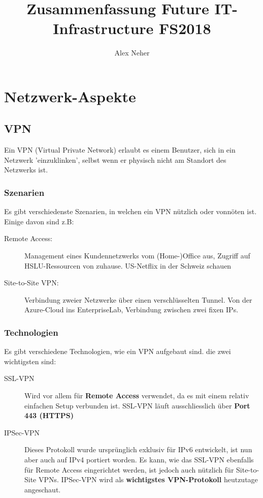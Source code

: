 \documentclass[a4paper, 11pt]{article}
\begin{document}
	
\title{Zusammenfassung Future IT-Infrastructure FS2018}
\author{Alex Neher}
\maketitle

\tableofcontents
\newpage

\graphicspath{{./Pictures/}}

\section{Netzwerk-Aspekte}
\subsection{VPN}
Ein VPN (Virtual Private Network) erlaubt es einem Benutzer, sich in ein Netzwerk 'einzuklinken', selbst wenn er physisch nicht am Standort des Netzwerks ist.

\subsubsection{Szenarien}
Es gibt verschiedenste Szenarien, in welchen ein VPN nützlich oder vonnöten ist. Einige davon sind z.B:
\begin{description}
	\item [Remote Access: ] Management eines Kundennetzwerks vom (Home-)Office aus, Zugriff auf HSLU-Ressourcen von zuhause. US-Netflix in der Schweiz schauen
	\item[Site-to-Site VPN: ] Verbindung zweier Netzwerke über einen verschlüsselten Tunnel. Von der Azure-Cloud ins EnterpriseLab, Verbindung zwischen zwei fixen IPs.
\end{description}

\subsubsection{Technologien}
Es gibt verschiedene Technologien, wie ein VPN aufgebaut sind. die zwei wichtigsten sind:

\begin{description}
	\item[SSL-VPN] Wird vor allem für \textbf{Remote Access} verwendet, da es mit einem relativ einfachen Setup verbunden ist. SSL-VPN läuft ausschliesslich über \textbf{Port 443 (HTTPS)}
	\item[IPSec-VPN] Dieses Protokoll wurde ursprünglich exklusiv für IPv6 entwickelt, ist nun aber auch auf IPv4 portiert worden. Es kann, wie das SSL-VPN ebenfalls für Remote Access eingerichtet werden, ist jedoch auch nützlich für Site-to-Site VPNs. IPSec-VPN wird als \textbf{wichtigstes VPN-Protokoll} heutzutage angeschaut.
\end{description}
\end{document}
